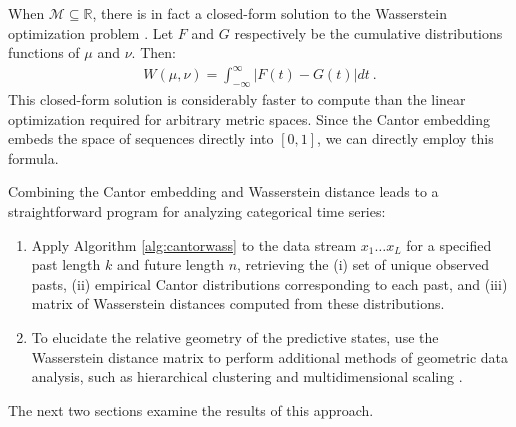 \documentclass[draft,aps,pre,twocolumn,groupaddress,showkeys,nofootinbib,preprintnumbers,floatfix]{revtex4-2}
\begin{document}
When $\mathcal{M} \subseteq \mathbb{R}$, there is in fact a closed-form solution
to the Wasserstein optimization problem \cite{Thas10a}. Let $F$ and $G$
respectively be the cumulative distributions functions of $\mu$ and $\nu$.
Then:
\begin{align*}
  W(\mu,\nu) = \int_{-\infty}^\infty \left|F(t)-G(t)\right| dt
  ~.
\end{align*}
This closed-form solution is considerably faster to compute than the linear
optimization required for arbitrary metric spaces. Since the Cantor embedding
embeds the space of sequences directly into $[0,1]$, we can directly employ
this formula.

Combining the Cantor embedding and Wasserstein distance leads to a
straightforward program for analyzing categorical time series:
\begin{enumerate}
\item Apply Algorithm \ref{alg:cantorwass} to the data stream $x_1\dots x_L$
	for a specified past length $k$ and future length $n$, retrieving the (i)
	set of unique observed pasts, (ii) empirical Cantor distributions
	corresponding to each past, and (iii) matrix of Wasserstein distances
	computed from these distributions.
\item To elucidate the relative geometry of the predictive states, use the
	Wasserstein distance matrix to perform additional methods of geometric data
	analysis, such as hierarchical clustering \cite{Mull11a} and
	multidimensional scaling \cite{Borg05a}.
\end{enumerate}
The next two sections examine the results of this approach.
\end{document}
